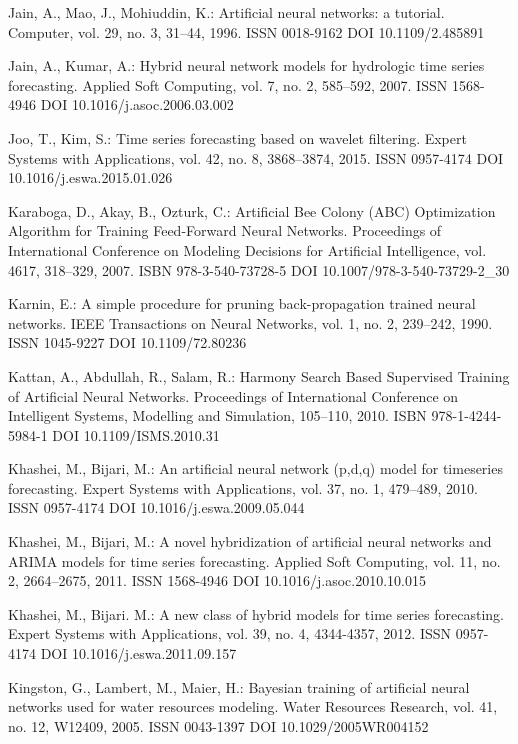 \begin{thebibliography}{99.}
 Jain, A., Mao, J., Mohiuddin, K.: Artificial neural networks: a tutorial. Computer, vol. 29, no. 3, 31--44, 1996. ISSN 0018-9162 DOI 10.1109/2.485891

 Jain, A., Kumar, A.: Hybrid neural network models for hydrologic time series forecasting. Applied Soft Computing, vol. 7, no. 2, 585--592, 2007. ISSN 1568-4946 DOI 10.1016/j.asoc.2006.03.002

 Joo, T., Kim, S.: Time series forecasting based on wavelet filtering. Expert Systems with Applications, vol. 42, no. 8, 3868--3874, 2015. ISSN 0957-4174 DOI 10.1016/j.eswa.2015.01.026

 Karaboga, D., Akay, B., Ozturk, C.: Artificial Bee Colony (ABC) Optimization Algorithm for Training Feed-Forward Neural Networks. Proceedings of International Conference on Modeling Decisions for Artificial Intelligence, vol. 4617, 318--329, 2007. ISBN 978-3-540-73728-5 DOI 10.1007/978-3-540-73729-2\_30

 Karnin, E.: A simple procedure for pruning back-propagation trained neural networks. IEEE Transactions on Neural Networks, vol. 1, no. 2, 239--242, 1990. ISSN 1045-9227 DOI 10.1109/72.80236

 Kattan, A., Abdullah, R., Salam, R.: Harmony Search Based Supervised Training of Artificial Neural Networks. Proceedings of International Conference on Intelligent Systems, Modelling and Simulation, 105--110, 2010. ISBN 978-1-4244-5984-1 DOI 10.1109/ISMS.2010.31

 Khashei, M., Bijari, M.: An artificial neural network (p,d,q) model for timeseries forecasting. Expert Systems with Applications, vol. 37, no. 1, 479--489, 2010. ISSN 0957-4174 DOI 10.1016/j.eswa.2009.05.044

 Khashei, M., Bijari, M.: A novel hybridization of artificial neural networks and ARIMA models for time series forecasting. Applied Soft Computing, vol. 11, no. 2, 2664--2675, 2011. ISSN 1568-4946 DOI 10.1016/j.asoc.2010.10.015

 Khashei, M., Bijari. M.: A new class of hybrid models for time series forecasting. Expert Systems with Applications, vol. 39, no. 4, 4344-4357, 2012. ISSN 0957-4174 DOI 10.1016/j.eswa.2011.09.157

 Kingston, G., Lambert, M., Maier, H.: Bayesian training of artificial neural networks used for water resources modeling. Water Resources Research, vol. 41, no. 12, W12409, 2005. ISSN 0043-1397 DOI 10.1029/2005WR004152


\end{thebibliography}
